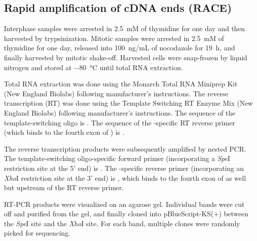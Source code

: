 \subsection{Rapid amplification of cDNA ends (RACE)}
Interphase samples were arrested in \SI{2.5}{mM} of thymidine for one day and then harvested by trypsinization. Mitotic samples were arrested in \SI{2.5}{mM} of thymidine for one day, released into \SI{100}{ng/mL} of nocodazole for \SI{19}{h}, and finally harvested by mitotic shake-off. Harvested cells were snap-frozen by liquid nitrogen and stored at \SI{-80}{\celsius} until total RNA extraction.

Total RNA extraction was done using the Monarch Total RNA Miniprep Kit (New England Biolabs) following manufacturer’s instructions. The reverse transcription (RT) was done using the Template Switching RT Enzyme Mix (New England Biolabs) following manufacturer’s instructions. The sequence of the template-switching oligo is . The sequence of the -specific RT reverse primer (which binds to the fourth exon of ) is .

The reverse transcription products were subsequently amplified by nested PCR. The template-switching oligo-specific forward primer (incorporating a \textit{Spe}I restriction site at the 5' end) is . The -specific reverse primer (incorporating an \textit{Xho}I restriction site at the 3' end) is , which binds to the fourth exon of  as well but upstream of the RT reverse primer.

RT-PCR products were visualized on an agarose gel. Individual bands were cut off and purified from the gel, and finally cloned into pBlueScript-KS(+) between the \textit{Spe}I site and the \textit{Xho}I site. For each band, multiple clones were randomly picked for sequencing.


